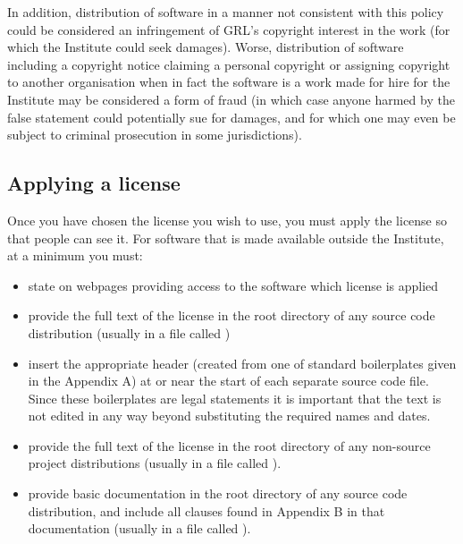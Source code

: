 \documentclass[10pt,a4paper]{article}
\begin{document}
\par In addition, distribution of software in a manner not consistent with this policy could be 
considered an infringement of GRL's copyright interest in the work (for which the 
Institute could seek damages). Worse, distribution of software including a copyright 
notice claiming a personal copyright or assigning copyright to another 
organisation when in fact the software is a work made for hire for the Institute may 
be considered a form of fraud (in which case anyone harmed by the false 
statement could potentially sue for damages, and for which one may even be subject 
to criminal prosecution in some jurisdictions). 


\subsection{Applying a license}

Once you have chosen the license you wish to use, you must apply the license so that 
people can see it. For software that is made available outside the Institute, at a 
minimum you must:

\begin{itemize}
\item state on webpages providing access to the software which license is applied 
\item provide the full text of the license in the root directory of any source code 
distribution (usually in a file called ) 
\item insert the appropriate header (created from one of standard boilerplates given in 
the Appendix A) at or near the start of each separate source code file. Since these 
boilerplates are legal statements it is important that the text is not edited in any 
way beyond substituting the required names and dates.
\item provide the full text of the license in the root directory of any non-source project 
distributions (usually in a file called ). 
\item provide basic documentation in the root directory of any source code 
distribution, and include all clauses found in Appendix B in that documentation 
(usually in a file called ). 
\end{itemize}


\end{document}

